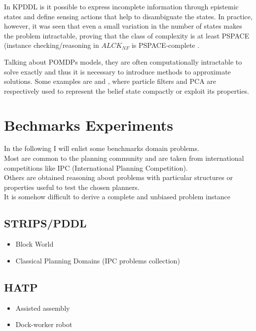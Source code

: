 \documentclass[pdftex,12pt,a4paper]{report}
\begin{document}
\noindent In KPDDL is it possible to express incomplete information through epistemic states and define sensing actions that help to disambiguate the states. In practice, however, it was seen that even a small variation in the number of states makes the problem intractable, proving that the class of complexity is at least PSPACE (instance checking/reasoning in $ALCK_{NF}$ is PSPACE-complete \cite{donini1997autoepistemic}.%
\newline

\noindent Talking about POMDPs models, they are often computationally intractable to solve exactly and thus it is necessary to introduce methods to approximate solutions. Some examples are \cite{roy2005finding}%
and \cite{brafman2014contingent},%
where particle filters and PCA are respectively used to represent the belief state compactly or exploit its properties.

\section{Bechmarks Experiments} \label{sec:benchmarks}
In the following I will enlist some benchmarks domain problems. \\ 
Most are common to the planning community and are taken from international competitions like IPC (International Planning Competition). \\
Others are obtained reasoning about problems with particular structures or properties useful to test the chosen planners.\\
It is somehow difficult to derive a complete and unbiased problem instance 

\subsection{STRIPS/PDDL}
\begin{itemize}
\item Block World
\item Classical Planning Domains (IPC problems collection)
\end{itemize}

\subsection{HATP}
\begin{itemize}
\item Assisted assembly
\item Dock-worker robot
\end{itemize}
\end{document}
